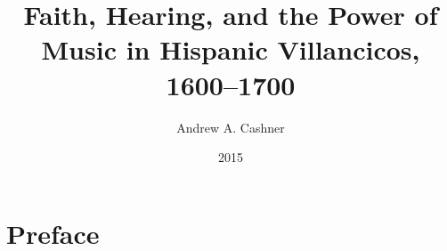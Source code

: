 \documentclass{memoir}
\begin{document}
    
    \frontmatter
    
    \begin{titlingpage}
    
    \title{Faith, Hearing, and the Power of Music in Hispanic Villancicos, 1600–1700}
  
    \author{Andrew A. Cashner}
  
    \date{2015}
  
    \maketitle
    \end{titlingpage}
    \tableofcontents*
  
    \chapter{Preface}
    \label{chapter:preface}
    
\end{document}
